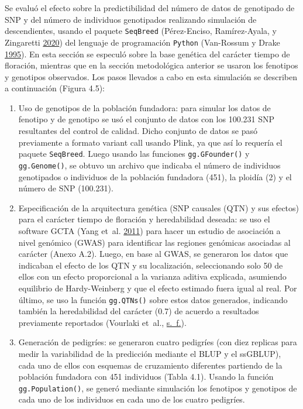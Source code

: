 \documentclass[11pt,spanish,a4paper,oneside,]{book} %
\begin{document}
Se evaluó el efecto sobre la predictibilidad del número de datos de genotipado de SNP y del número de individuos genotipados realizando simulación de descendientes, usando el paquete \texttt{SeqBreed} (Pérez-Enciso, Ramírez-Ayala, y Zingaretti \protect\hyperlink{ref-cite:47}{2020}) del lenguaje de programación \texttt{Python} (Van-Rossum y Drake \protect\hyperlink{ref-cite:53}{1995}). En esta sección se especuló sobre la base genética del carácter tiempo de floración, mientras que en la sección metodológica anterior se usaron los fenotipos y genotipos observados. Los pasos llevados a cabo en esta simulación se describen a continuación (Figura 4.5):

\begin{enumerate}
\def\labelenumi{\arabic{enumi}.}
\item
  Uso de genotipos de la población fundadora: para simular los datos de fenotipo y de genotipo se usó el conjunto de datos con los 100.231 SNP resultantes del control de calidad. Dicho conjunto de datos se pasó previamente a formato variant call usando Plink, ya que así lo requería el paquete \texttt{SeqBreed}. Luego usando las funciones \texttt{gg.GFounder()} y \texttt{gg.Genome()}, se obtuvo un archivo que indicaba el número de individuos genotipados o individuos de la población fundadora (451), la ploidía (2) y el número de SNP (100.231).
\item
  Especificación de la arquitectura genética (SNP causales (QTN) y sus efectos) para el carácter tiempo de floración y heredabilidad deseada: se uso el software GCTA (Yang et~al. \protect\hyperlink{ref-cite:54}{2011}) para hacer un estudio de asociación a nivel genómico (GWAS) para identificar las regiones genómicas asociadas al carácter (Anexo A.2). Luego, en base al GWAS, se generaron los datos que indicaban el efecto de los QTN y su localización, seleccionando solo 50 de ellos con un efecto proporcional a la varianza aditiva explicada, asumiendo equilibrio de Hardy-Weinberg y que el efecto estimado fuera igual al real. Por último, se uso la función \texttt{gg.QTNs()} sobre estos datos generados, indicando también la heredabilidad del carácter (0.7) de acuerdo a resultados previamente reportados (Vourlaki et~al., \protect\hyperlink{ref-cite:26}{s.~f.}).
\item
  Generación de pedigríes: se generaron cuatro pedigríes (con diez replicas para medir la variabilidad de la predicción mediante el BLUP y el ssGBLUP), cada uno de ellos con esquemas de cruzamiento diferentes partiendo de la población fundadora con 451 individuos (Tabla 4.1). Usando la función \texttt{gg.Population()}, se generó mediante simulación los fenotipos y genotipos de cada uno de los individuos en cada uno de los cuatro pedigríes.
  \hspace*{1em}
\end{enumerate}
\end{document}
